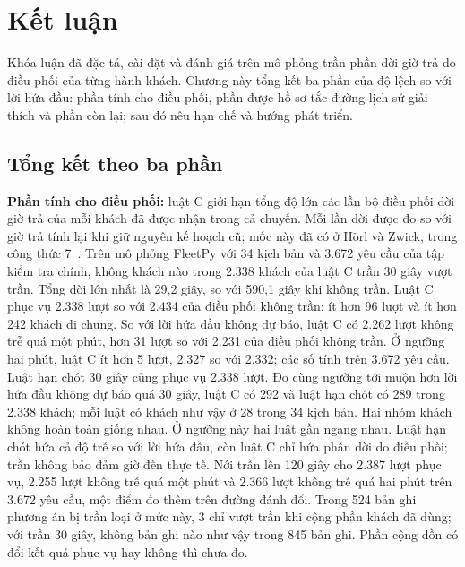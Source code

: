 \chapter{Kết luận}
\label{chuong:ketluan}

Khóa luận đã đặc tả, cài đặt và đánh giá trên mô phỏng trần phần dời giờ trả do điều phối của từng hành khách. Chương này tổng kết ba phần của độ lệch so với lời hứa đầu: phần tính cho điều phối, phần được hồ sơ tắc đường lịch sử giải thích và phần còn lại; sau đó nêu hạn chế và hướng phát triển.

\section{Tổng kết theo ba phần}
\label{muc:c5-tongket}

\textbf{Phần tính cho điều phối:} luật C giới hạn tổng độ lớn các lần bộ điều phối dời giờ trả của mỗi khách đã được nhận trong cả chuyến. Mỗi lần dời được đo so với giờ trả tính lại khi giữ nguyên kế hoạch cũ; mốc này đã có ở Hörl và Zwick, trong công thức 7~\cite{horl2022}. Trên mô phỏng FleetPy với 34 kịch bản và 3.672 yêu cầu của tập kiểm tra chính, không khách nào trong 2.338 khách của luật C trần 30 giây vượt trần. Tổng dời lớn nhất là 29,2 giây, so với 590,1 giây khi không trần. Luật C phục vụ 2.338 lượt so với 2.434 của điều phối không trần: ít hơn 96 lượt và ít hơn 242 khách đi chung. So với lời hứa đầu không dự báo, luật C có 2.262 lượt không trễ quá một phút, hơn 31 lượt so với 2.231 của điều phối không trần. Ở ngưỡng hai phút, luật C ít hơn 5 lượt, 2.327 so với 2.332; các số tính trên 3.672 yêu cầu. Luật hạn chót 30 giây cũng phục vụ 2.338 lượt. Đo cùng ngưỡng tới muộn hơn lời hứa đầu không dự báo quá 30 giây, luật C có 292 và luật hạn chót có 289 trong 2.338 khách; mỗi luật có khách như vậy ở 28 trong 34 kịch bản. Hai nhóm khách không hoàn toàn giống nhau. Ở ngưỡng này hai luật gần ngang nhau. Luật hạn chót hứa cả độ trễ so với lời hứa đầu, còn luật C chỉ hứa phần dời do điều phối; trần không bảo đảm giờ đến thực tế. Nới trần lên 120 giây cho 2.387 lượt phục vụ, 2.255 lượt không trễ quá một phút và 2.366 lượt không trễ quá hai phút trên 3.672 yêu cầu, một điểm đo thêm trên đường đánh đổi. Trong 524 bản ghi phương án bị trần loại ở mức này, 3 chỉ vượt trần khi cộng phần khách đã dùng; với trần 30 giây, không bản ghi nào như vậy trong 845 bản ghi. Phần cộng dồn có đổi kết quả phục vụ hay không thì chưa đo.

